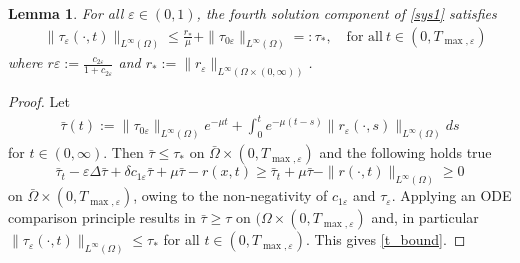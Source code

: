 \documentclass[a4paper,10pt]{article}
\newtheorem{Lemma}[Theorem]{Lemma}
\theoremstyle{definition}
\begin{document}
\begin{Lemma}
  \label{ht_bound}
   For all $\varepsilon \in (0, 1)$,  the fourth solution component of \eqref{sys1} satisfies
  \begin{align}
    \label{t_bound} & \|\tau_\varepsilon(\cdot, t)\|_{L^\infty(\Omega)} \leq \frac{r_\ast}{\mu} + \|\tau_{0 \varepsilon }\|_{L^\infty(\Omega)} =: \tau_\ast,\quad \text{for all}~ t \in (0, T_{\max, \varepsilon})
  \end{align}
   where $r\varepsilon:= \frac{c_{2\varepsilon}}{1 + c_{2\varepsilon}}$ and $r_\ast := \|r_\varepsilon\|_{L^\infty(\Omega \times (0, \infty))}$.
\end{Lemma}


\begin{proof}
  Let
  \begin{align*}
    \bar{\tau}(t) := \|\tau_{0 \varepsilon}\|_{L^\infty(\Omega)}e^{- \mu t} + \int_0^t e^{-\mu (t - s)} \|r_\varepsilon (\cdot, s)\|_{L^\infty(\Omega)} ds
  \end{align*}
  for $t \in (0, \infty)$. Then $\bar{\tau} \leq \tau_\ast$ on $\bar{\Omega} \times (0, T_{\max, \varepsilon})$ and the following holds true
  \begin{equation*}
    \bar{\tau}_t - \varepsilon \Delta \bar{\tau} + \delta c_{1 \varepsilon} \bar{\tau} + \mu \bar{\tau} - r(x, t) \geq \bar{\tau}_t + \mu \bar{\tau} - \|r(\cdot, t)\|_{L^\infty(\Omega)} \geq 0
  \end{equation*}
  on $\bar{\Omega} \times (0, T_{\max, \varepsilon})$, owing to the non-negativity of $c_{1\varepsilon}$ and $\tau_\varepsilon$. Applying an ODE comparison principle results in $\bar{\tau} \geq \tau$ on $(\Omega \times (0, T_{\max, \varepsilon})$ and, in particular $\|\tau_\varepsilon(\cdot, t)\|_{L^\infty(\Omega)} \leq \tau_\ast$ for all $t \in (0, T_{\max, \varepsilon})$. This gives \eqref{t_bound}.
\end{proof}
\end{document}
